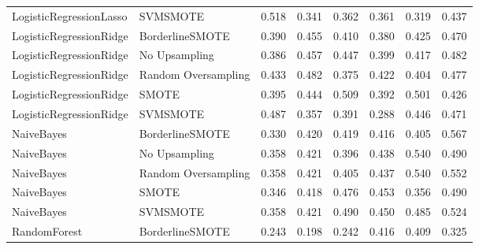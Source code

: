 \begin{tabular}{llllllll}
     LogisticRegressionLasso &            SVMSMOTE & 0.518 &                     0.341 &                 0.362 &                  0.361 &                                   0.319 &    0.437 \\
     LogisticRegressionRidge &     BorderlineSMOTE & 0.390 &                     0.455 &                 0.410 &                  0.380 &                                   0.425 &    0.470 \\
     LogisticRegressionRidge &       No Upsampling & 0.386 &                     0.457 &                 0.447 &                  0.399 &                                   0.417 &    0.482 \\
     LogisticRegressionRidge & Random Oversampling & 0.433 &                     0.482 &                 0.375 &                  0.422 &                                   0.404 &    0.477 \\
     LogisticRegressionRidge &               SMOTE & 0.395 &                     0.444 &                 0.509 &                  0.392 &                                   0.501 &    0.426 \\
     LogisticRegressionRidge &            SVMSMOTE & 0.487 &                     0.357 &                 0.391 &                  0.288 &                                   0.446 &    0.471 \\
                  NaiveBayes &     BorderlineSMOTE & 0.330 &                     0.420 &                 0.419 &                  0.416 &                                   0.405 &    0.567 \\
                  NaiveBayes &       No Upsampling & 0.358 &                     0.421 &                 0.396 &                  0.438 &                                   0.540 &    0.490 \\
                  NaiveBayes & Random Oversampling & 0.358 &                     0.421 &                 0.405 &                  0.437 &                                   0.540 &    0.552 \\
                  NaiveBayes &               SMOTE & 0.346 &                     0.418 &                 0.476 &                  0.453 &                                   0.356 &    0.490 \\
                  NaiveBayes &            SVMSMOTE & 0.358 &                     0.421 &                 0.490 &                  0.450 &                                   0.485 &    0.524 \\
                RandomForest &     BorderlineSMOTE & 0.243 &                     0.198 &                 0.242 &                  0.416 &                                   0.409 &    0.325 \\

\end{tabular}
